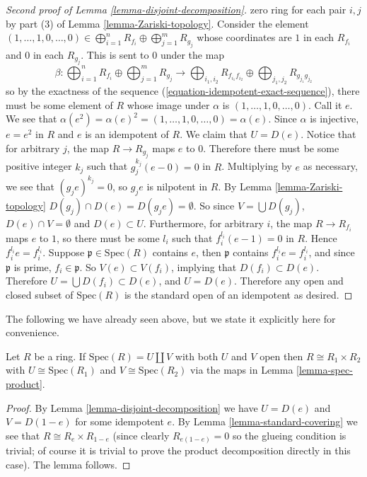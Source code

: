 \begin{proof}[Second proof of Lemma \ref{lemma-disjoint-decomposition}]
zero ring for each pair $i, j$ by part (3) of
Lemma \ref{lemma-Zariski-topology}.
Consider the element
$(1, \ldots, 1, 0, \ldots, 0) \in \bigoplus_{i = 1}^ {n} R_{f_{i}}
\oplus \bigoplus_{j = 1}^{m} R_{g_j}$
whose coordinates are $1$ in each $R_{f_i}$ and
$0$ in each $R_{g_j}$. This is sent to $0$ under the map
$$
\beta : \bigoplus\nolimits_{i = 1}^ {n} R_{f_{i}} \oplus
\bigoplus\nolimits_{j = 1}^{m} R_{g_j}
\rightarrow \bigoplus\nolimits_{i_1, i_2} R_{f_{i_1}f_{i_2}} \oplus
\bigoplus\nolimits_{j_1, j_2}
R_{g_{j_1}g_{j_2}}
$$
so by the exactness of the
sequence (\ref{equation-idempotent-exact-sequence}), there must be some
element of $R$ whose image under $\alpha$ is $(1, \ldots, 1, 0, \ldots, 0)$.
Call it $e$. We see that
$\alpha(e^2) = \alpha(e)^2 = (1, \ldots, 1, 0, \ldots, 0) = \alpha(e)$.
Since $\alpha$ is
injective, $e = e^2$ in $R$ and $e$ is an idempotent of $R$. We claim that
$U = D(e)$.
Notice that for arbitrary $j$, the map $R \rightarrow R_{g_j}$ maps $e$
to $0$. Therefore there must be some positive integer $k_j$ such that
$g_j^{k_j}(e-0) = 0$ in $R$. Multiplying by $e$ as necessary,
we see that $(g_j e)^{k_j} = 0$,
so $g_j e$ is nilpotent in $R$. By
Lemma \ref{lemma-Zariski-topology}
$D(g_j) \cap D(e) = D(g_j e) = \emptyset$. So since
$V = \bigcup D(g_j)$, $D(e) \cap V = \emptyset$ and
$D(e) \subset U$. Furthermore, for arbitrary $i$, the
map $R \rightarrow R_{f_i}$ maps $e$ to $1$, so there must be some $l_i$ such
that $f_i^{l_i}(e-1) =0$ in $R$. Hence $f_i^{l_i}e = f_i^{l_i}$. Suppose
$\mathfrak{p} \in \text{Spec}(R)$ contains $e$,
then $\mathfrak{p}$ contains
$f_i^{l_i}e = f_i^{l_i}$, and since $\mathfrak{p}$ is prime, $f_i \in
\mathfrak{p}$. So $V(e) \subset V(f_i)$, implying that $D(f_i) \subset D(e)$.
Therefore $U = \bigcup D(f_i) \subset D(e)$, and $U = D(e)$.
Therefore any open
and closed subset of $\text{Spec}(R)$ is the standard open
of an idempotent as
desired.
\end{proof}

\noindent
The following we have already seen above, but we state it explicitly here
for convenience.

\begin{lemma}
\label{lemma-disjoint-implies-product}
Let $R$ be a ring.
If $\text{Spec}(R) = U \amalg V$ with both $U$ and $V$ open
then $R \cong R_1 \times R_2$ with $U \cong \text{Spec}(R_1)$
and $V \cong \text{Spec}(R_2)$ via the maps in Lemma \ref{lemma-spec-product}.
\end{lemma}

\begin{proof}
By Lemma \ref{lemma-disjoint-decomposition} we have
$U = D(e)$ and $V = D(1-e)$ for some idempotent $e$.
By Lemma \ref{lemma-standard-covering} we see that
$R \cong R_e \times R_{1 - e}$ (since clearly $R_{e(1-e)} = 0$
so the glueing condition is trivial; of course it is
trivial to prove the product decomposition directly in this
case). The lemma follows.
\end{proof}


